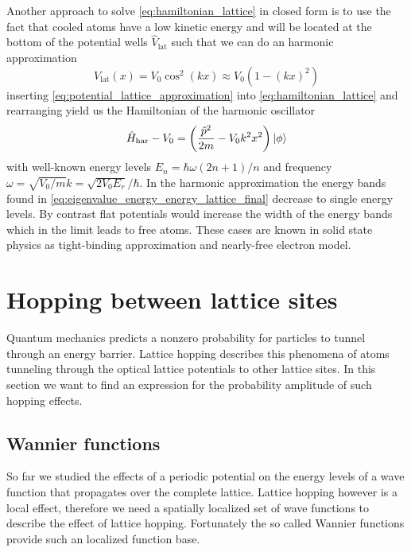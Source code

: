 Another approach to solve \cref{eq:hamiltonian_lattice} in closed form is to
use the fact that cooled atoms have a low kinetic energy and will be located
at the bottom of the potential wells $\hat{V}_\text{lat}$ such that we can
do an harmonic approximation
\begin{equation}
  V_\text{lat}(x)
  =V_0\cos^2(kx)
  \approx V_0\left(1-(kx)^2\right)
  \label{eq:potential_lattice_approximation}
\end{equation}
inserting \cref{eq:potential_lattice_approximation} into
\cref{eq:hamiltonian_lattice} and rearranging yield us the Hamiltonian of
the harmonic oscillator
\begin{equation}
  \hat{H}_\text{har}-V_0
  =\left(\frac{\hat{p}^2}{2m}-V_0k^2x^2\right)\ket{\phi}
  \label{eq:hamiltonian_harmonic}
\end{equation}
with well-known energy levels $E_n=\hbar\omega(2n+1)/n$ and frequency
$\omega=\sqrt{V_0/m}k=\sqrt{2V_0E_r}/\hbar$. In the harmonic approximation
the energy bands found in \cref{eq:eigenvalue_energy_energy_lattice_final}
decrease to single energy levels. By contrast flat potentials would increase
the width of the energy bands which in the limit leads to free atoms. These
cases are known in solid state physics as tight-binding approximation and
nearly-free electron model.

\section{Hopping between lattice sites}

Quantum mechanics predicts a nonzero probability for particles to tunnel
through an energy barrier. Lattice hopping describes this phenomena of atoms
tunneling through the optical lattice potentials to other lattice sites. In
this section we want to find an expression for the probability amplitude of
such hopping effects.

\subsection{Wannier functions}

So far we studied the effects of a periodic potential on the energy levels of
a wave function that propagates over the complete lattice. Lattice hopping
however is a local effect, therefore we need a spatially localized set of
wave functions to describe the effect of lattice hopping. Fortunately the
so called Wannier functions provide such an localized function base.

